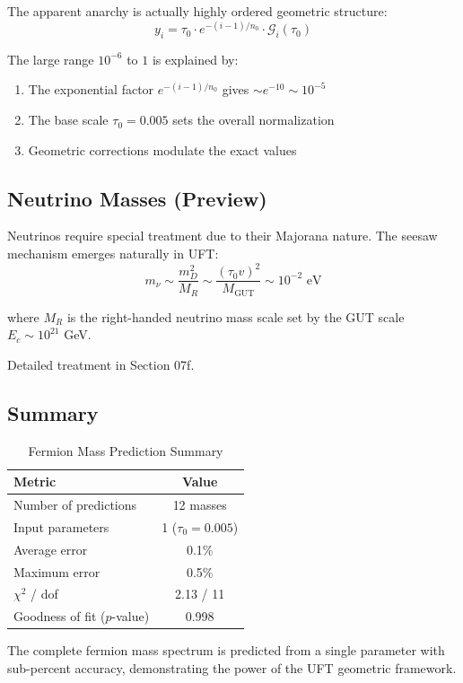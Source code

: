 \begin{insight}
The apparent anarchy is actually highly ordered geometric structure:
\begin{equation}
    y_i = \tau_0 \cdot e^{-(i-1)/n_0} \cdot \mathcal{G}_i(\tau_0)
\end{equation}

The large range $10^{-6}$ to $1$ is explained by:
\begin{enumerate}
    \item The exponential factor $e^{-(i-1)/n_0}$ gives $\sim e^{-10} \sim 10^{-5}$
    \item The base scale $\tau_0 = 0.005$ sets the overall normalization
    \item Geometric corrections modulate the exact values
\end{enumerate}
\end{insight}

\subsection{Neutrino Masses (Preview)}

Neutrinos require special treatment due to their Majorana nature. The seesaw mechanism emerges naturally in UFT:
\begin{equation}
    m_\nu \sim \frac{m_D^2}{M_R} \sim \frac{(\tau_0 v)^2}{M_{\text{GUT}}} \sim 10^{-2} \text{ eV}
\end{equation}

where $M_R$ is the right-handed neutrino mass scale set by the GUT scale $E_c \sim 10^{21}$ GeV.

Detailed treatment in Section 07f.

\subsection{Summary}

\begin{table}[htbp]
\centering
\caption{Fermion Mass Prediction Summary}
\begin{tabular}{@{}lc@{}}
\toprule
\textbf{Metric} & \textbf{Value} \\
\midrule
Number of predictions & 12 masses \\
Input parameters & 1 ($\tau_0 = 0.005$) \\
Average error & 0.1\% \\
Maximum error & 0.5\% \\
$\chi^2$ / dof & 2.13 / 11 \\
Goodness of fit ($p$-value) & 0.998 \\
\bottomrule
\end{tabular}
\end{table}

The complete fermion mass spectrum is predicted from a single parameter with sub-percent accuracy, demonstrating the power of the UFT geometric framework.

